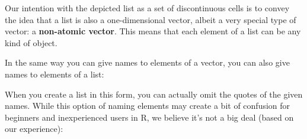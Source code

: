 \documentclass[
]{book}
\newenvironment{Shaded}{\begin{snugshade}}{\end{snugshade}}
\newcommand{\AttributeTok}[1]{\textcolor[rgb]{0.77,0.63,0.00}{#1}}
\newcommand{\CommentTok}[1]{\textcolor[rgb]{0.56,0.35,0.01}{\textit{#1}}}
\newcommand{\DecValTok}[1]{\textcolor[rgb]{0.00,0.00,0.81}{#1}}
\newcommand{\ErrorTok}[1]{\textcolor[rgb]{0.64,0.00,0.00}{\textbf{#1}}}
\newcommand{\FunctionTok}[1]{\textcolor[rgb]{0.00,0.00,0.00}{#1}}
\newcommand{\NormalTok}[1]{#1}
\newcommand{\OtherTok}[1]{\textcolor[rgb]{0.56,0.35,0.01}{#1}}
\newcommand{\SpecialCharTok}[1]{\textcolor[rgb]{0.00,0.00,0.00}{#1}}
\newcommand{\StringTok}[1]{\textcolor[rgb]{0.31,0.60,0.02}{#1}}
\begin{document}
Our intention with the depicted list as a set of discontinuous cells is to
convey the idea that a list is also a one-dimensional vector, albeit a very
special type of vector: a \textbf{non-atomic vector}. This means that each element
of a list can be any kind of object.

In the same way you can give names to elements of a vector, you can also give
names to elements of a list:

\begin{Shaded}
\end{Shaded}

When you create a list in this form, you can actually omit the quotes of
the given names. While this option of naming elements may create a bit of
confusion for beginners and inexperienced users in R, we believe it's not a big
deal (based on our experience):

\begin{Shaded}
\end{Shaded}
\end{document}
